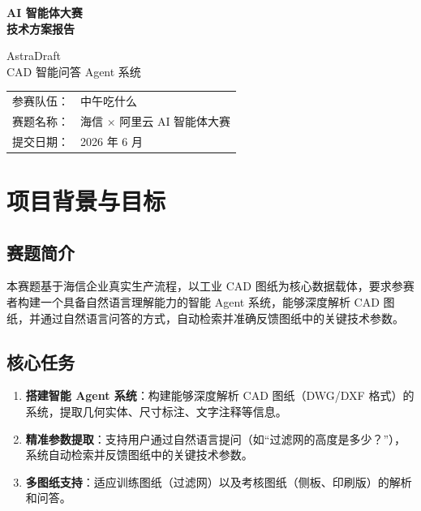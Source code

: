 \documentclass[11pt,a4paper]{article}
\begin{document}
\begin{titlepage}
  \centering
  \vspace*{3cm}

  {\Huge\bfseries AI 智能体大赛 \\[6pt]
   技术方案报告}

  \vspace{1.5cm}

  {\LARGE AstraDraft \\[8pt]
   CAD 智能问答 Agent 系统}

  \vspace{3cm}

  {\large
   \begin{tabular}{rl}
     参赛队伍： & 中午吃什么 \\
     赛题名称： & 海信 × 阿里云 AI 智能体大赛 \\
     提交日期： & 2026 年 6 月 \\
   \end{tabular}
  }

  \vfill
\end{titlepage}

\newpage
\tableofcontents
\newpage

\section{项目背景与目标}

\subsection{赛题简介}

本赛题基于海信企业真实生产流程，以工业 CAD 图纸为核心数据载体，要求参赛者构建一个具备自然语言理解能力的智能 Agent 系统，能够深度解析 CAD 图纸，并通过自然语言问答的方式，自动检索并准确反馈图纸中的关键技术参数。

\subsection{核心任务}

\begin{enumerate}[nosep]
  \item \textbf{搭建智能 Agent 系统}：构建能够深度解析 CAD 图纸（DWG/DXF 格式）的系统，提取几何实体、尺寸标注、文字注释等信息。
  \item \textbf{精准参数提取}：支持用户通过自然语言提问（如“过滤网的高度是多少？”），系统自动检索并反馈图纸中的关键技术参数。
  \item \textbf{多图纸支持}：适应训练图纸（过滤网）以及考核图纸（侧板、印刷版）的解析和问答。
\end{enumerate}
\end{document}
